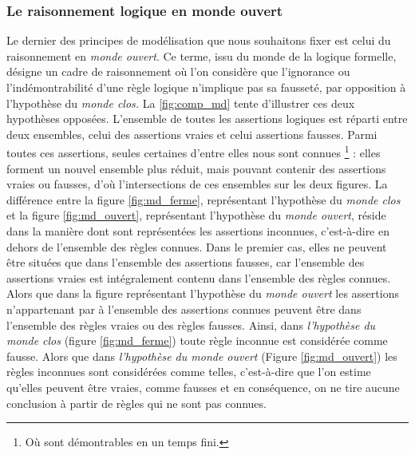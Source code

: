 \subsubsection{Le raisonnement logique en monde ouvert}

Le dernier des principes de modélisation que nous souhaitons fixer est
celui du raisonnement en \emph{monde ouvert}. Ce terme, issu du monde
de la logique formelle, désigne un cadre de raisonnement où l'on
considère que l'ignorance ou l'indémontrabilité d'une règle logique
n'implique pas sa fausseté, par opposition à l'hypothèse du
\emph{monde clos.} La \autoref{fig:comp_md} tente d'illustrer ces deux
hypothèses opposées. L'ensemble de toutes les assertions logiques est
réparti entre deux ensembles, celui des assertions vraies et celui
assertions fausses. Parmi toutes ces assertions, seules certaines
d'entre elles nous sont connues \footnote{Où sont démontrables en un
  temps fini.} : elles forment un nouvel ensemble plus réduit, mais
pouvant contenir des assertions vraies ou fausses, d'où
l'intersections de ces ensembles sur les deux figures. La différence
entre la figure \ref{fig:md_ferme}, représentant l'hypothèse du
\emph{monde clos} et la figure \ref{fig:md_ouvert}, représentant
l'hypothèse du \emph{monde ouvert}, réside dans la manière dont sont
représentées les assertions inconnues, c'est-à-dire en dehors de
l'ensemble des règles connues. Dans le premier cas, elles ne peuvent
être situées que dans l'ensemble des assertions fausses, car
l'ensemble des assertions vraies est intégralement contenu dans
l'ensemble des règles connues. Alors que dans la figure représentant
l'hypothèse du \emph{monde ouvert} les assertions n'appartenant par à
l'ensemble des assertions connues peuvent être dans l'ensemble des
règles vraies ou des règles fausses. Ainsi, dans \emph{l'hypothèse du
  monde clos} (figure \ref{fig:md_ferme}) toute règle inconnue est
considérée comme fausse. Alors que dans \emph{l'hypothèse du monde
  ouvert} (Figure \ref{fig:md_ouvert}) les règles inconnues sont
considérées comme telles, c'est-à-dire que l'on estime qu'elles
peuvent être vraies, comme fausses et en conséquence, on ne tire
aucune conclusion à partir de règles qui ne sont pas connues.

